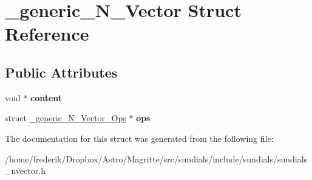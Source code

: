\hypertarget{struct__generic__N__Vector}{}\section{\+\_\+generic\+\_\+\+N\+\_\+\+Vector Struct Reference}
\label{struct__generic__N__Vector}
\subsection*{Public Attributes}
\begin{DoxyCompactItemize}
\item 
\mbox{\label{struct__generic__N__Vector_a995a7d38094dae148dd912886391f803}} 
void $\ast$ {\bfseries content}
\item 
\mbox{\label{struct__generic__N__Vector_a7b27698a38d4bf2037602e4d18e6353c}} 
struct \mbox{\hyperlink{struct__generic__N__Vector__Ops}{\+\_\+generic\+\_\+\+N\+\_\+\+Vector\+\_\+\+Ops}} $\ast$ {\bfseries ops}
\end{DoxyCompactItemize}


The documentation for this struct was generated from the following file\+:\begin{DoxyCompactItemize}
\item 
/home/frederik/\+Dropbox/\+Astro/\+Magritte/src/sundials/include/sundials/sundials\+\_\+nvector.\+h\end{DoxyCompactItemize}
